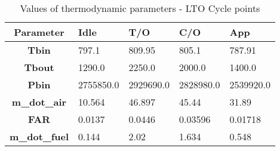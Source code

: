 \begin{table}[h!]
  \centering
  \begin{tabularx}{\textwidth}{||c|X|X|X|X||}
  \hline
    \cellcolor{gray!20}\textbf{Parameter} & \cellcolor{gray!20}\textbf{Idle} & \cellcolor{gray!20}\textbf{T/O} & \cellcolor{gray!20}\textbf{C/O} & \cellcolor{gray!20}\textbf{App} \\ [0.5ex]
  \hline\hline
\centering
    \cellcolor{gray!20}\textbf{Tbin} & 797.1 & 809.95 & 805.1 & 787.91 \\
  \hline
    \cellcolor{gray!20}\textbf{Tbout} & 1290.0 & 2250.0 & 2000.0 & 1400.0 \\
  \hline
    \cellcolor{gray!20}\textbf{Pbin} & 2755850.0 & 2929690.0 & 2828980.0 & 2539920.0 \\
  \hline
    \cellcolor{gray!20}\textbf{m_dot_air} & 10.564 & 46.897 & 45.44 & 31.89 \\
  \hline
    \cellcolor{gray!20}\textbf{FAR} & 0.0137 & 0.0446 & 0.03596 & 0.01718 \\
  \hline
    \cellcolor{gray!20}\textbf{m_dot_fuel} & 0.144 & 2.02 & 1.634 & 0.548 \\
  \hline
  \end{tabularx}
  \caption{Values of thermodynamic parameters - LTO Cycle points}
  \label{tab:Thermo}
\end{table}
